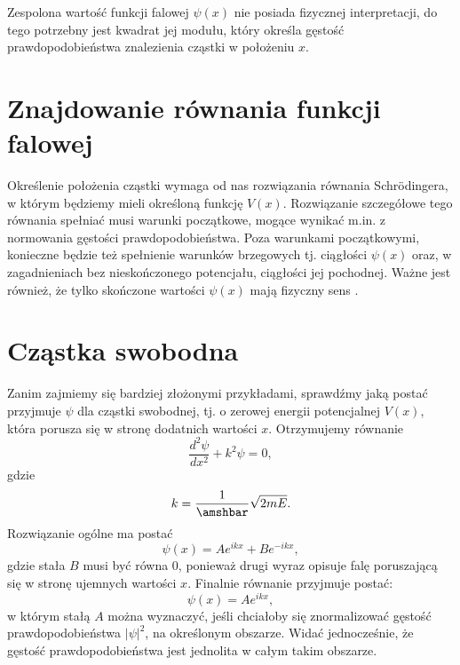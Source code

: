 \documentclass{SGGW-thesis}
\begin{document}
	Zespolona wartość funkcji falowej $\psi(x)$ nie posiada fizycznej interpretacji, do tego potrzebny jest kwadrat jej modułu, który określa gęstość prawdopodobieństwa znalezienia cząstki w położeniu $x$. 
	\section{Znajdowanie równania funkcji falowej}
	Określenie położenia cząstki wymaga od nas rozwiązania równania Schrödingera, w którym będziemy mieli określoną funkcję $V(x)$. Rozwiązanie szczegółowe tego równania spełniać musi warunki początkowe, mogące wynikać m.in. z normowania gęstości prawdopodobieństwa. Poza warunkami początkowymi, konieczne będzie też spełnienie warunków brzegowych tj. ciągłości $\psi(x)$ oraz, w zagadnieniach bez nieskończonego potencjału, ciągłości jej pochodnej. Ważne jest również, że tylko skończone wartości $\psi(x)$ mają fizyczny sens \cite{fiz atom}.
	
	\section{Cząstka swobodna}
	Zanim zajmiemy się bardziej złożonymi przykładami, sprawdźmy jaką postać przyjmuje $\psi$ dla cząstki swobodnej, tj. o zerowej energii potencjalnej $V(x)$, która porusza się w stronę dodatnich wartości $x$. Otrzymujemy równanie 
	\begin{equation}\label{eqn:free-particle-schrodigner}
	\frac{d^2\psi}{dx^2}+k^2\psi=0,
	\end{equation}
gdzie
	\begin{equation}
	k=\frac{1}{\amshbar}\sqrt{2mE}.
	\end{equation}
Rozwiązanie ogólne ma postać
	\begin{equation}\label{eqn:free-particle-gen-solution}
	\psi(x)=Ae^{ikx} + Be^{-ikx},
	\end{equation}
gdzie stała $B$ musi być równa 0, ponieważ drugi wyraz opisuje falę poruszającą się w stronę ujemnych wartości $x$. Finalnie równanie przyjmuje postać:
	\begin{equation}\label{eqn:free-particle-solution}
	\psi(x) = Ae^{ikx},
	\end{equation}
w którym stałą $A$ można wyznaczyć, jeśli chciałoby się znormalizować gęstość prawdopodobieństwa $|\psi|^2$, na określonym obszarze. Widać jednocześnie, że gęstość prawdopodobieństwa jest jednolita w całym takim obszarze.
	
\end{document}
